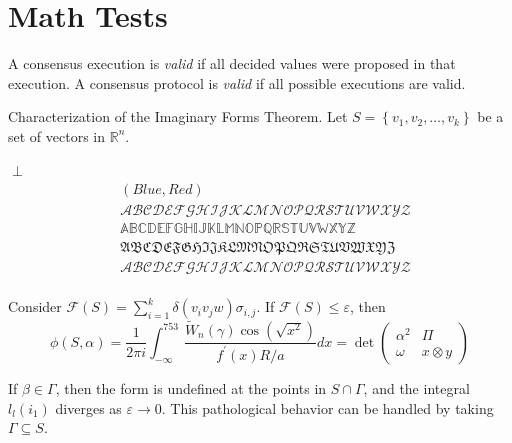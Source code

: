 \section{Math Tests}

\begin{definition}[name={Heterogeneous Validity \protect\citep{art-2024-heterogeneous-paxos-20-specs}}, label={def:het-valid}]
    A consensus execution is \emph{valid} if all decided values were proposed in that execution. A
    consensus protocol is \emph{valid} if all possible executions are valid.
\end{definition}

Characterization of the Imaginary Forms Theorem. Let $S=\left\{v_1, v_2, \ldots,
v_k\right\}$ be a set of vectors in $\mathbb{R}^n$.


\begin{center}
    $\perp$
    \begin{equation}
        \begin{split}
        &(\mathit{Blue}, \mathit{Red})\\
        &\mathcal{ABC DEF GHI JKL MNO PQR ST UVW XYZ}\\
        &\mathbb{ABC DEF GHI JKL MNO PQR ST UVW XYZ}\\
        &\mathfrak{ABC DEF GHI JKL MNO PQR ST UVW XYZ}\\
        &\mathscr{ABC DEF GHI JKL MNO PQR ST UVW XYZ}\\
        \end{split}
    \end{equation}
\end{center}
Consider $\mathcal{F}(S)=\sum_{i=1}^k \delta\left(v_i v_j w\right) \sigma_{i,
j}$. If $\mathcal{F}(S) \leq \varepsilon$, then
$$
\phi(S, \alpha)=\frac{1}{2 \pi i} \int_{-\infty}^{753} \frac{\tilde{W}_n(\gamma) \cos \left(\sqrt{x^2}\right)}{f^{\prime}(x) R / a} d x=\operatorname{det}\left(\begin{array}{cc}
\alpha^2 & \Pi \\
\omega & x \otimes y
\end{array}\right)
$$

\begin{remark}
    If $\beta \in \Gamma$, then the form is undefined at the points in $S \cap
    \Gamma$, and the integral $l_l\left(i_1\right)$ diverges as $\varepsilon
    \rightarrow 0$. This pathological behavior can be handled by taking $\Gamma
    \subseteq S$.
\end{remark}

